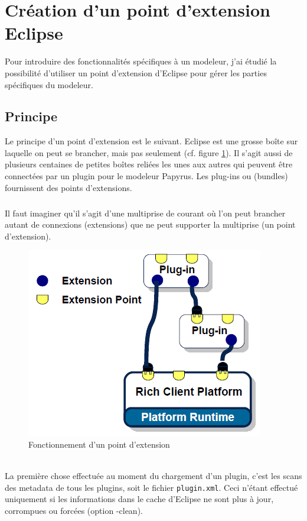 \section{Création d'un point d'extension Eclipse}\label{section_build}

Pour introduire des fonctionnalités spécifiques à un modeleur, j'ai étudié la possibilité d'utiliser un point d'extension d'Eclipse pour gérer les parties spécifiques du modeleur.

\subsection{Principe}

Le principe d'un point d'extension est le suivant. 
Eclipse est une grosse boîte sur laquelle on peut se brancher, mais pas seulement (cf. figure \ref{extension_point}).
Il s'agit aussi de plusieurs centaines de petites boîtes reliées les unes aux autres qui peuvent être connectées par un plugin pour le modeleur Papyrus. 
Les plug-ins ou (bundles) fournissent des points d'extensions.

\subparagraph*{}
Il faut imaginer qu'il s'agit d'une multiprise de courant où l'on peut brancher autant de connexions (extensions) que ne peut supporter la multiprise (un point d'extension).

\begin{figure}[!ht]
\begin{center}
  \includegraphics[scale=.5]{images/extension_point.png}
  \caption{Fonctionnement d'un point d'extension}
  \label{extension_point}
\end{center}
\end{figure}
\ \\
La première chose effectuée au moment du chargement d'un plugin, c'est les scans des metadata de tous les plugins, soit le fichier \texttt{plugin.xml}. 
Ceci n'étant effectué uniquement si les informations dans le cache d'Eclipse ne sont plus à jour, corrompues ou forcées (option -clean).

